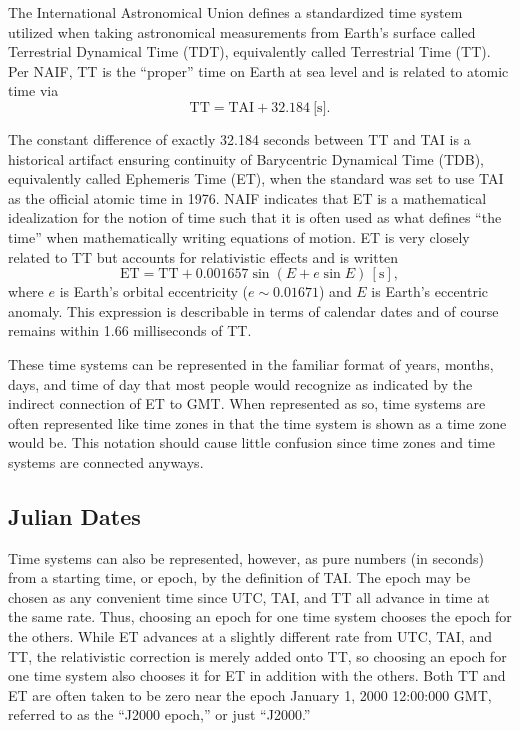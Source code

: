 \documentclass[11pt,dvipsnames]{thesis}
\begin{document}
The International Astronomical Union defines a standardized time system utilized when taking astronomical measurements from Earth's surface called Terrestrial Dynamical Time (TDT), equivalently called Terrestrial Time (TT). Per NAIF, TT is the ``proper'' time on Earth at sea level and is related to atomic time via
\begin{equation}
\mathrm{TT} = \mathrm{TAI} + \SI{32.184 }{[\s]}.
\end{equation}

The constant difference of exactly 32.184 seconds between TT and TAI is a historical artifact ensuring continuity of Barycentric Dynamical Time (TDB), equivalently called Ephemeris Time (ET), when the standard was set to use TAI as the official atomic time in 1976. NAIF indicates that ET is a mathematical idealization for the notion of time such that it is often used as what defines ``the time'' when mathematically writing equations of motion. ET is very closely related to TT but accounts for relativistic effects and is written
\begin{equation}
\mathrm{ET} = \mathrm{TT} + \num{0.001657} \sin(E + e \sin E) \,[\si{\s}],
\end{equation}
where $e$ is Earth's orbital eccentricity ($e \sim 0.01671$) and $E$ is Earth's eccentric anomaly. This expression is describable in terms of calendar dates and of course remains within 1.66 milliseconds of TT.

These time systems can be represented in the familiar format of years, months, days, and time of day that most people would recognize as indicated by the indirect connection of ET to GMT. When represented as so, time systems are often represented like time zones in that the time system is shown as a time zone would be. This notation should cause little confusion since time zones and time systems are connected anyways.

\subsection{Julian Dates}
Time systems can also be represented, however, as pure numbers (in seconds) from a starting time, or epoch, by the definition of TAI. The epoch may be chosen as any convenient time since UTC, TAI, and TT all advance in time at the same rate. Thus, choosing an epoch for one time system chooses the epoch for the others. While ET advances at a slightly different rate from UTC, TAI, and TT, the relativistic correction is merely added onto TT, so choosing an epoch for one time system also chooses it for ET in addition with the others. Both TT and ET are often taken to be zero near the epoch January 1, 2000 12:00:000 GMT, referred to as the ``J2000 epoch,'' or just ``J2000.''
\end{document}
